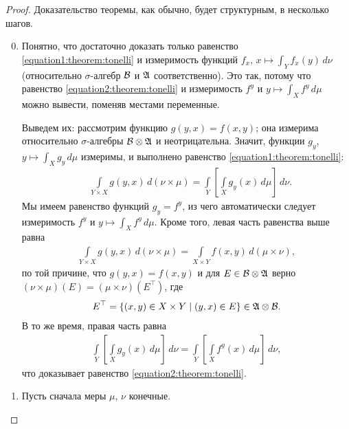 \begin{proof}
 Доказательство теоремы, как обычно, будет структурным, в несколько шагов.

  \begin{enumerate}
   \setcounter{enumi}{-1}
  \item Понятно, что достаточно доказать только равенство \eqref{equation1:theorem:tonelli} и измеримость функций $f_x$, $x \mapsto \int_{Y} f_x(y) \, d\nu $ (относительно $\sigma$-алгебр $\mathcal{B}$ и $\mathfrak{A}$ соответственно). Это так, потому что равенство \eqref{equation2:theorem:tonelli} и измеримость $f^{y}$ и $y \mapsto \int_{X} f^{y} \, d\mu $ можно вывести, поменяв местами переменные.

   Выведем их: рассмотрим функцию $g(y, x) = f(x,y)$; она измерима относительно $\sigma$-алгебры $\mathcal{B} \otimes \mathfrak{A}$ и неотрицательна. Значит, функции $g_y$, $y \mapsto \int_{X} g_y \, d\mu  $ измеримы, и выполнено равенство \eqref{equation1:theorem:tonelli}:
 \begin{align*}
  &\int\limits_{Y \times X} g(y, x) \, d(\nu \times \mu)  = \int\limits_{Y} \left[ \int\limits_{X} g_y(x) \, d\mu   \right] \, d\nu
 .\end{align*} Мы имеем равенство функций $g_y = f^{y}$, из чего автоматически следует измеримость $f^{y}$ и $y \mapsto \int_{X} f^{y} \, d\mu  $. Кроме того, левая часть равенства выше равна
 \begin{align*}
  \int\limits_{Y \times X} g(y,x) \, d(\nu \times \mu)  = \int\limits_{X \times Y} f(x,y) \, d(\mu \times \nu)   
 ,\end{align*} по той причине, что $g(y,x) = f(x,y)$ и для $E \in \mathcal{B}\otimes\mathfrak{A}$ верно $(\nu \times \mu)(E) = (\mu \times \nu)(E^{\top})$, где \begin{align*}
  E^{\top} = \left\{ (x, y) \in X \times Y \;\middle|\; (y, x) \in E \right\}  \in \mathfrak{A} \otimes \mathcal{B}
 .\end{align*}
 В то же время, правая часть равна 
 \begin{align*}
  \int\limits_{Y} \left[ \int\limits_{X} g_y(x) \, d\mu   \right] \, d\nu = \int\limits_{Y} \left[ \int\limits_{X} f^{y}(x) \, d\mu   \right] \, d\nu,
 \end{align*} что доказывает равенство \eqref{equation2:theorem:tonelli}.


  \item Пусть сначала меры $\mu$, $\nu$ конечные.


\end{enumerate}
\end{proof}
